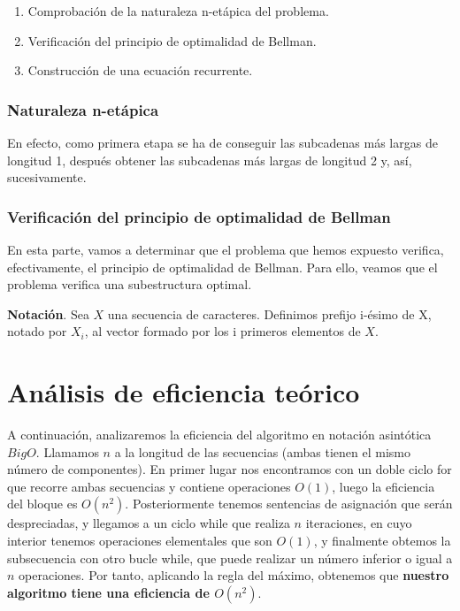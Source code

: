 \begin{enumerate}
    \item Comprobación de la naturaleza n-etápica del problema. 
    \item Verificación del principio de optimalidad de Bellman. 
    \item Construcción de una ecuación recurrente. 
\end{enumerate}

\subsubsection{Naturaleza n-etápica}
En efecto, 
como primera etapa se ha de conseguir las subcadenas más largas de longitud 1, 
después obtener las subcadenas más largas de longitud 2 y, así, sucesivamente. 


\subsubsection{Verificación del principio de optimalidad de Bellman}

En esta parte, vamos a determinar que el problema que hemos expuesto verifica,
efectivamente, el principio de optimalidad de Bellman. Para ello, veamos que el
problema verifica una subestructura optimal.

\textbf{Notación}. Sea $X$ una secuencia de caracteres. Definimos prefijo i-ésimo
de X, notado por $X_i$, al vector formado por los i primeros elementos de $X$. 

\begin{theorem}
    
\end{theorem}


\section{Análisis de eficiencia teórico}

A continuación, analizaremos la eficiencia del algoritmo en notación asintótica $BigO$.
Llamamos $n$ a la longitud de las secuencias (ambas tienen el mismo número de componentes). En primer lugar nos encontramos con un doble ciclo for que recorre ambas
secuencias y contiene operaciones $O(1)$, luego la eficiencia del bloque es $O(n^{2})$.
Posteriormente tenemos sentencias de asignación que serán despreciadas, y llegamos a un
ciclo while que realiza $n$ iteraciones, en cuyo interior tenemos operaciones elementales que son $O(1)$, y finalmente obtemos la subsecuencia con otro bucle while, que puede realizar un número inferior o igual a $n$ operaciones. Por tanto, aplicando la regla del máximo, obtenemos que \textbf{nuestro algoritmo tiene una eficiencia de $O(n^{2})$}.
 
















